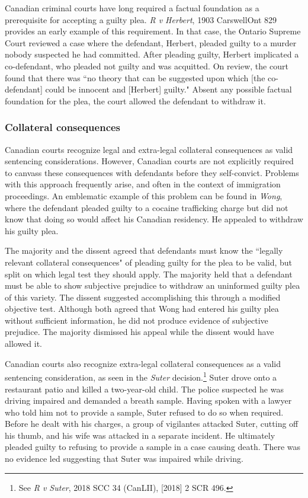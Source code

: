 Canadian criminal courts have long required a factual foundation as a prerequisite for accepting a guilty plea. \textit{R v Herbert}, 1903 CarswellOnt 829 provides an early example of this requirement. In that case, the Ontario Supreme Court reviewed a case where the defendant, Herbert, pleaded guilty to a murder nobody suspected he had committed. After pleading guilty, Herbert implicated a co-defendant, who pleaded not guilty and was acquitted. On review, the court found that there was ``no theory that can be suggested upon which [the co-defendant] could be innocent and [Herbert] guilty." Absent any possible factual foundation for the plea, the court allowed the defendant to withdraw it.

\subsubsection{Collateral consequences}

Canadian courts recognize legal and extra-legal collateral consequences as valid sentencing considerations. However, Canadian courts are not explicitly required to canvass these consequences with defendants before they self-convict. Problems with this approach frequently arise, and often in the context of immigration proceedings. An emblematic example of this problem can be found in \textit{Wong}, where the defendant pleaded guilty to a cocaine trafficking charge but did not know that doing so would affect his Canadian residency. He appealed to withdraw his guilty plea. 

The majority and the dissent agreed that defendants must know the ``legally relevant collateral consequences" of pleading guilty for the plea to be valid, but split on which legal test they should apply. The majority held that a defendant must be able to show subjective prejudice to withdraw an uninformed guilty plea of this variety. The dissent suggested accomplishing this through a modified objective test. Although both agreed that Wong had entered his guilty plea without sufficient information, he did not produce evidence of subjective prejudice. The majority dismissed his appeal while the dissent would have allowed it.

Canadian courts also recognize extra-legal collateral consequences as a valid sentencing consideration, as seen in the \textit{Suter} decision.\footnote{See \textit{R v Suter}, 2018 SCC 34 (CanLII), [2018] 2 SCR 496.} Suter drove onto a restaurant patio and killed a two-year-old child. The police suspected he was driving impaired and demanded a breath sample. Having spoken with a lawyer who told him not to provide a sample, Suter refused to do so when required. Before he dealt with his charges, a group of vigilantes attacked Suter, cutting off his thumb, and his wife was attacked in a separate incident. He ultimately pleaded guilty to refusing to provide a sample in a case causing death. There was no evidence led suggesting that Suter was impaired while driving.

